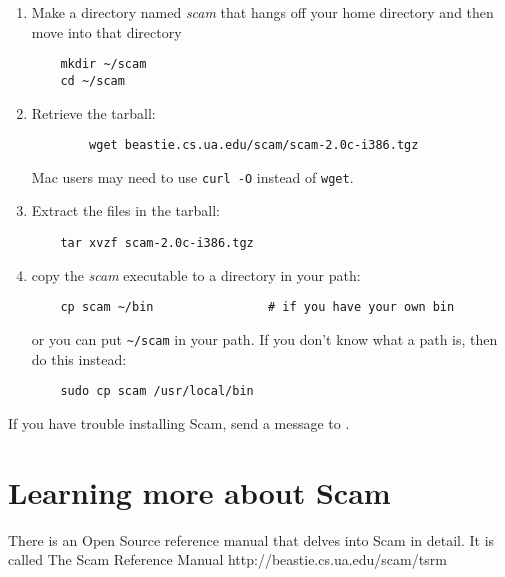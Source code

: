 \documentclass{article}
\begin{document}
\begin{enumerate}

\item
    Make a directory named {\it scam} that hangs off your home directory
    and then move into that directory

\begin{verbatim}
    mkdir ~/scam
    cd ~/scam
\end{verbatim}

\item
    Retrieve the tarball:

\begin{verbatim}
        wget beastie.cs.ua.edu/scam/scam-2.0c-i386.tgz
\end{verbatim}

    Mac users may need to use \verb!curl -O! instead of \verb!wget!.

\item
    Extract the files in the tarball:

\begin{verbatim}
    tar xvzf scam-2.0c-i386.tgz
\end{verbatim}

\item
    copy the {\it scam} executable to a directory in your path:

\begin{verbatim}
    cp scam ~/bin                # if you have your own bin
\end{verbatim}

or you can put \verb!~/scam! in your path.
If you don't know what a path is, then do this instead:

\begin{verbatim}
    sudo cp scam /usr/local/bin
\end{verbatim}

\end{enumerate}

If you have trouble installing Scam, send a message to 
.

\section*{Learning more about Scam}

There is an Open Source
reference manual that delves into Scam in detail.
It is called 
\xlink
    {The Scam Reference Manual}
    {http://beastie.cs.ua.edu/scam/tsrm}
\end{document}
